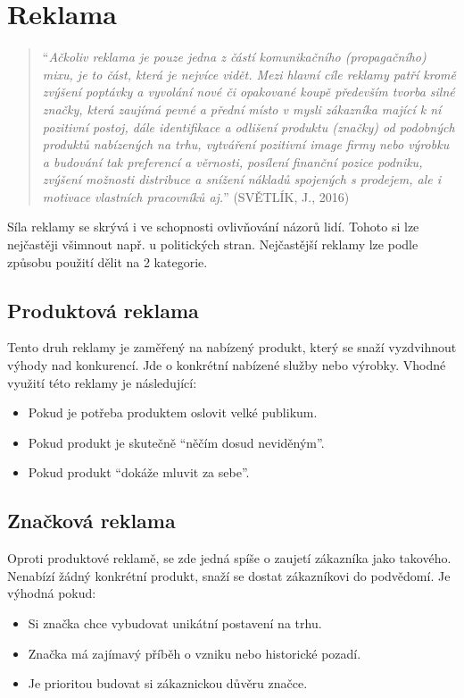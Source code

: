 \section{Reklama}
    \begin{quote}
        \enquote{\emph{Ačkoliv reklama je pouze jedna z částí komunikačního (propagačního) mixu, je to část, která je nejvíce vidět.
        Mezi hlavní cíle reklamy patří kromě zvýšení poptávky a vyvolání nové či opakované koupě především tvorba silné značky,
        která zaujímá pevné a přední místo v mysli zákazníka mající k ní pozitivní postoj, dále identifikace a
        odlišení produktu (značky) od podobných produktů nabízených na trhu,
        vytváření pozitivní image firmy nebo výrobku a budování tak preferencí a věrnosti, posílení finanční pozice podniku,
        zvýšení možnosti distribuce a snížení nákladů spojených s prodejem, ale i motivace vlastních pracovníků aj.}}
        (SVĚTLÍK, J., 2016) \cite{svetlik:marketing}
    \end{quote}
    

    Síla reklamy se skrývá i ve schopnosti ovlivňování názorů lidí. Tohoto si lze nejčastěji všimnout např.
    u politických stran. Nejčastější reklamy lze podle způsobu použití dělit na 2 kategorie.

    \subsection{Produktová reklama}
    Tento druh reklamy je zaměřený na nabízený produkt, který se snaží vyzdvihnout výhody nad konkurencí.
    Jde o konkrétní nabízené služby nebo výrobky. Vhodné využití této reklamy je následující:
    \begin{itemize}
        \item Pokud je potřeba produktem oslovit velké publikum.
        \item Pokud produkt je skutečně \enquote{něčím dosud neviděným}.
        \item Pokud produkt \enquote{dokáže mluvit za sebe}.
    \end{itemize}

    \subsection{Značková reklama}
    Oproti produktové reklamě, se zde jedná spíše o zaujetí zákazníka jako takového. Nenabízí žádný konkrétní produkt,
    snaží se dostat zákazníkovi do podvědomí. Je výhodná pokud:
    \begin{itemize}
        \item Si značka chce vybudovat unikátní postavení na trhu. 
        \item Značka má zajímavý příběh o vzniku nebo historické pozadí. 
        \item Je prioritou budovat si zákaznickou důvěru značce. 
    \end{itemize}

